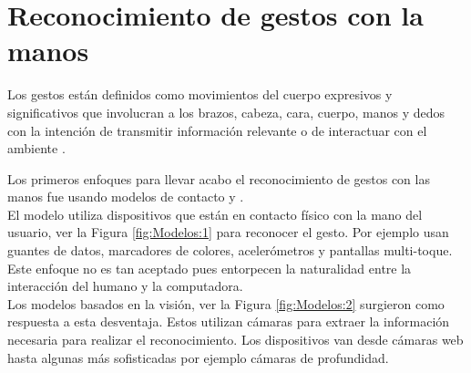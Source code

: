 \section{Reconocimiento de gestos con la manos}\label{sec:ReconocimientoGestos} 

Los gestos están definidos como movimientos del cuerpo expresivos y significativos que involucran a los  brazos, cabeza, cara, cuerpo, manos y dedos con la intención de transmitir información relevante o de interactuar con el ambiente \citep{Mitra2007}.

Los primeros enfoques para llevar acabo el reconocimiento de gestos con las manos fue usando modelos de contacto \citep{Rautaray2012} y \citep{Nayakwadi2014}.\\
El modelo utiliza dispositivos que est\'an en contacto f\'isico con la mano del usuario, ver la Figura \ref{fig:Modelos:1} para reconocer el gesto. Por ejemplo usan guantes de datos, marcadores de colores, acelerómetros y pantallas multi-toque. Este enfoque no es  tan aceptado pues entorpecen la naturalidad entre la interacción del humano y la computadora.\\
Los modelos basados en la visión, ver la Figura \ref{fig:Modelos:2} surgieron como respuesta a esta desventaja. Estos utilizan cámaras para extraer la información necesaria para realizar el reconocimiento. Los dispositivos van desde cámaras web hasta algunas más sofisticadas por ejemplo c\'amaras de profundidad.   

